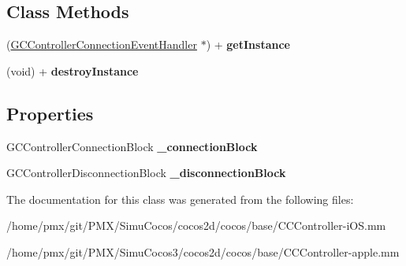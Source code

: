 \subsection*{Class Methods}
\begin{DoxyCompactItemize}
\item 
\mbox{\label{classGCControllerConnectionEventHandler_a6fdd03eee1990389b600186b358f713b}} 
(\hyperlink{classGCControllerConnectionEventHandler}{G\+C\+Controller\+Connection\+Event\+Handler} $\ast$) + {\bfseries get\+Instance}
\item 
\mbox{\label{classGCControllerConnectionEventHandler_a92ce1b3caae06d7af3ce0d05f00475e3}} 
(void) + {\bfseries destroy\+Instance}
\end{DoxyCompactItemize}
\subsection*{Properties}
\begin{DoxyCompactItemize}
\item 
\mbox{\label{classGCControllerConnectionEventHandler_a89f34816e10279d0ce58652d2519acbf}} 
G\+C\+Controller\+Connection\+Block {\bfseries \+\_\+connection\+Block}
\item 
\mbox{\label{classGCControllerConnectionEventHandler_a16cbf7992437abc5d6a7a7ab808cb3c7}} 
G\+C\+Controller\+Disconnection\+Block {\bfseries \+\_\+disconnection\+Block}
\end{DoxyCompactItemize}


The documentation for this class was generated from the following files\+:\begin{DoxyCompactItemize}
\item 
/home/pmx/git/\+P\+M\+X/\+Simu\+Cocos/cocos2d/cocos/base/C\+C\+Controller-\/i\+O\+S.\+mm\item 
/home/pmx/git/\+P\+M\+X/\+Simu\+Cocos3/cocos2d/cocos/base/C\+C\+Controller-\/apple.\+mm\end{DoxyCompactItemize}

